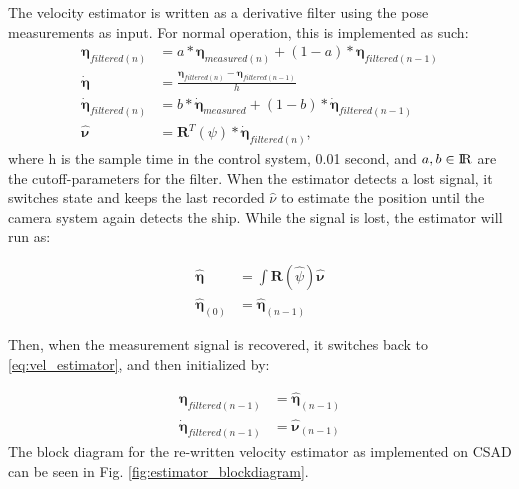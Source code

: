 The velocity estimator is written as a derivative filter using the pose measurements as input. For normal operation, this is implemented as such:
\begin{align}
    \boldsymbol{\eta}_{filtered(n)} &= a*\boldsymbol{\eta}_{measured(n)} + (1-a)*\boldsymbol{\eta}_{filtered(n-1)} \\
    \boldsymbol{\Dot{\eta}} &= \frac{\boldsymbol{\eta}_{filtered(n)}-\boldsymbol{\eta}_{filtered(n-1)}}{h} \\
    \boldsymbol{\Dot{\eta}}_{filtered(n)} &= b*\boldsymbol{\Dot{\eta}}_{measured} + (1-b)*\boldsymbol{\Dot{\eta}}_{filtered(n-1)}\\
    \boldsymbol{\hat{\nu}} &= \boldsymbol{R}^T(\psi)*\boldsymbol{\Dot{\eta}}_{filtered(n)},
\end{align}\label{eq:vel_estimator}
where h is the sample time in the control system, 0.01 second, and $a,b \in {\rm I\!R}$ are the cutoff-parameters for the filter. When the estimator detects a lost signal, it switches state and keeps the last recorded $\hat{\nu}$ to estimate the position until the camera system again detects the ship. While the signal is lost, the estimator will run as:

\begin{align}
    \boldsymbol{\hat{\eta}} &= \int \boldsymbol{R}(\hat{\psi})\boldsymbol{\hat{\nu}}\\
    \boldsymbol{\hat{\eta}}_{(0)} &= \boldsymbol{\hat{\eta}}_{(n-1)}
\end{align}

Then, when the measurement signal is recovered, it switches back to \ref{eq:vel_estimator}, and then initialized by:

\begin{align}
    \boldsymbol{\eta}_{filtered(n-1)} &= \boldsymbol{\hat{\eta}}_{(n-1)} \\
    \boldsymbol{\Dot{\eta}}_{filtered(n-1)} &= \boldsymbol{\hat{\nu}}_{(n-1)}
\end{align}
The block diagram for the re-written velocity estimator as implemented on CSAD can be seen in Fig. \ref{fig:estimator_blockdiagram}.

